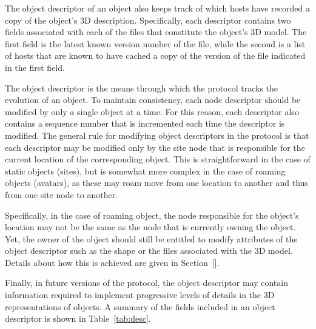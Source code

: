 The object descriptor of an object also keeps track of which hosts
have recorded a copy of the object's 3D description. Specifically,
each descriptor contains two fields associated with each of the files
that constitute the object's 3D model. The first field is the latest
known version number of the file, while the second is a list of hosts
that are known to have cached a copy of the version of the file
indicated in the first field.

The object descriptor is the means through which the \sol protocol
tracks the evolution of an object. To maintain consistency, each node
descriptor should be modified by only a single object at a time.  For
this reason, each descriptor also contains a sequence number that is
incremented each time the descriptor is modified.  The general rule
for modifying object descriptors in the \sol protocol is that each
descriptor may be modified only by the site node that is responsible
for the current location of the corresponding object. This is
straightforward in the case of static objects (sites), but is somewhat
more complex in the case of roaming objects (avatars), as these may
roam move from one location to another and thus from one site node to
another. 

Specifically, in the case of roaming object, the node responsible for
the object's location may not be the same as the node that is
currently owning the object. Yet, the owner of the object should still
be entitled to modify attributes of the object descriptor such as the
shape or the files associated with the 3D model. Details about how
this is achieved are given in Section~\ref{}. %

Finally, in future versions of the protocol, the object descriptor may
contain information required to implement progressive levels of
details in the 3D representations of objects.  A summary of the fields
included in an object descriptor is shown in Table~\ref{tab:desc}.

